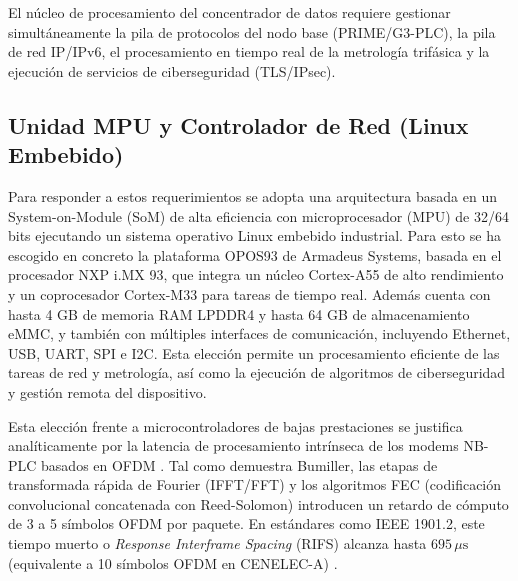 El núcleo de procesamiento del concentrador de datos requiere gestionar simultáneamente la pila de protocolos del nodo base (PRIME/G3-PLC), la pila de red IP/IPv6, el procesamiento en tiempo real de la metrología trifásica y la ejecución de servicios de ciberseguridad (TLS/IPsec).

\subsection{Unidad MPU y Controlador de Red (Linux Embebido)}
\label{subsec:mpu_linux}

Para responder a estos requerimientos se adopta una arquitectura basada en un System-on-Module (SoM) de alta eficiencia con microprocesador (MPU) de 32/64 bits ejecutando un sistema operativo Linux embebido industrial. Para esto se ha escogido en concreto la plataforma OPOS93 de Armadeus Systems, basada en el procesador NXP i.MX 93, que integra un núcleo Cortex-A55 de alto rendimiento y un coprocesador Cortex-M33 para tareas de tiempo real. Además cuenta con hasta 4 GB de memoria RAM LPDDR4 y hasta 64 GB de almacenamiento eMMC, y también con múltiples interfaces de comunicación, incluyendo Ethernet, USB, UART, SPI e I2C. Esta elección permite un procesamiento eficiente de las tareas de red y metrología, así como la ejecución de algoritmos de ciberseguridad y gestión remota del dispositivo.

Esta elección frente a microcontroladores de bajas prestaciones se justifica analíticamente por la latencia de procesamiento intrínseca de los modems NB-PLC basados en OFDM \cite{7147624}. Tal como demuestra Bumiller, las etapas de transformada rápida de Fourier (IFFT/FFT) y los algoritmos FEC (codificación convolucional concatenada con Reed-Solomon) introducen un retardo de cómputo de 3 a 5 símbolos OFDM por paquete. En estándares como IEEE 1901.2, este tiempo muerto o \textit{Response Interframe Spacing} (RIFS) alcanza hasta $695\,\mu\text{s}$ (equivalente a 10 símbolos OFDM en CENELEC-A) \cite{7147624}.



